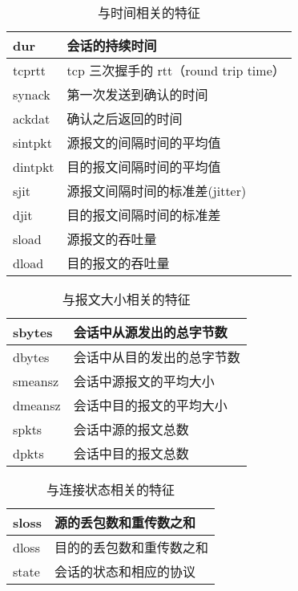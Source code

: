\begin{table}[H]
    \caption{与时间相关的特征}
    \centering
    \begin{tabular}{|l|l|}
    \hline
    dur     & 会话的持续时间                        \\ \hline
    tcprtt  & tcp 三次握手的 rtt（round trip time） \\ \hline
    synack  & 第一次发送到确认的时间                    \\ \hline
    ackdat  & 确认之后返回的时间                      \\ \hline
    sintpkt & 源报文的间隔时间的平均值                   \\ \hline
    dintpkt & 目的报文间隔时间的平均值                   \\ \hline
    sjit    & 源报文间隔时间的标准差(jitter)            \\ \hline
    djit    & 目的报文间隔时间的标准差                   \\ \hline
    sload   & 源报文的吞吐量                        \\ \hline
    dload   & 目的报文的吞吐量                       \\ \hline
    \end{tabular}
    \end{table}

    \begin{table}[H]
        \caption{与报文大小相关的特征}
        \centering
        \begin{tabular}{|l|l|}
        \hline
        sbytes  & 会话中从源发出的总字节数  \\ \hline
        dbytes  & 会话中从目的发出的总字节数 \\ \hline
        smeansz & 会话中源报文的平均大小   \\ \hline
        dmeansz & 会话中目的报文的平均大小  \\ \hline
        spkts   & 会话中源的报文总数     \\ \hline
        dpkts   & 会话中目的报文总数     \\ \hline
        \end{tabular}
        \end{table}

\begin{table}[H]
    \caption{与连接状态相关的特征}
    \centering
    \begin{tabular}{|l|l|}
    \hline
    sloss & 源的丢包数和重传数之和  \\ \hline
    dloss & 目的的丢包数和重传数之和 \\ \hline
    state & 会话的状态和相应的协议  \\ \hline
    \end{tabular}
    \end{table}

